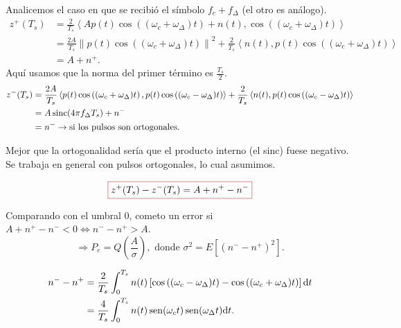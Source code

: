 Analicemos el caso en que se recibió el símbolo $f_c+f_\Delta$ (el
otro es análogo).
    \begin{align*}
        z^+(T_s) &= \frac{2}{T_s} \left<A p(t) \cos\left((\omega_c+\omega_\Delta)t\right)+n(t),\cos\left((\omega_c+\omega_\Delta)t\right)\right>\\
        &= \frac{2A}{T_s} \left\|p(t)\cos\left((\omega_c+\omega_\Delta)t\right)\right\|^2 +
        \frac{2}{T_s}\left<n(t),p(t)\cos\left((\omega_c+\omega_\Delta)t\right)\right>\\
        & =A+n^+.
     \end{align*}
Aquí usamos que la norma del primer término es $\frac{T_s}{2}$.
    \begin{align*}
        z^-(T_s) &= \frac{2A}{T_s}\left<p(t)\cos\left((\omega_c+\omega_\Delta)t\right),p(t)\cos\left((\omega_c-\omega_\Delta)t\right)\right>  + \frac{2}{T_s}\left<n(t),p(t)\cos\left((\omega_c-\omega_\Delta)t\right)\right>\\
        &= A\operatorname{sinc}(4\pi f_\Delta T_s) + n^-\\
        &= n^- \rightarrow \text{si los pulsos son ortogonales.}
    \end{align*}
   \begin{remarkSN}
    Mejor que la ortogonalidad sería que el producto interno (el
    sinc) fuese negativo.  Se trabaja en general con pulsos ortogonales, lo cual
    asumimos.\vspace{-0.5cm}
    \end{remarkSN}
    \[\col{z^+(T_s)-z^-(T_s) = A + n^+ - n^-}\]

    Comparando con el umbral $0$, cometo un error si  $A + n^+ - n^- < 0  \Leftrightarrow n^- -
    n^+ > A$.
    \[\Rightarrow P_e = Q\left(\frac{A}{\sigma}\right), \text{ donde } \sigma^2 = E\left[(n^- - n^+)^2\right].\]

    \begin{align*}
        n^- - n^+ &= \frac{2}{T_s} \int_0^{T_s} n(t)\left[\cos\left((\omega_c - \omega_\Delta)t\right) - \cos\left((\omega_c + \omega_\Delta)t\right)\right]\mathrm{d} t\\
        &= \frac{4}{T_s} \int_0^{T_s} n(t)\operatorname{sen}(\omega_c t)\operatorname{sen}(\omega_\Delta t)\mathrm{d}
        t.
    \end{align*}

